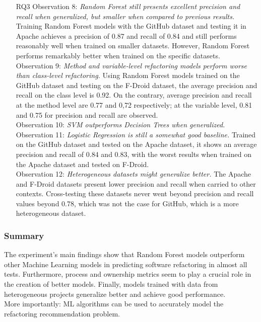 \begin{itemize}
    \item[RQ3] Observation 8: \textit{Random Forest still presents excellent precision and recall when generalized, but smaller when compared to previous results.} Training Random Forest models with the GitHub dataset and testing it in Apache achieves a precision of 0.87 and recall of 0.84 and still performs reasonably well when trained on smaller datasets. However, Random Forest performs remarkably better when trained on the specific datasets.\\Observation 9: \textit{Method and variable-level refactoring models perform worse than class-level refactoring.} Using Random Forest models trained on the GitHub dataset and testing on the F-Droid dataset, the average precision and recall on the class level is 0.92. On the contrary, average precision and recall at the method level are 0.77 and 0,72 respectively; at the variable level, 0.81 and 0.75 for precision and recall are observed.\\ Observation 10: \textit{SVM outperforms Decision Trees when generalized.} \\ Observation 11: \textit{Logistic Regression is still a somewhat good baseline.} Trained on the GitHub dataset and tested on the Apache dataset, it shows an average precision and recall of 0.84 and 0.83, with the worst results when trained on the Apache dataset and tested on F-Droid. \\ Observation 12: \textit{Heterogeneous datasets might generalize better.} The Apache and F-Droid datasets present lower precision and recall when carried to other contexts. Cross-testing these datasets never went beyond precision and recall values beyond 0.78, which was not the case for GitHub, which is a more heterogeneous dataset.
\end{itemize}
\subsubsection{Summary}
The experiment's main findings show that Random Forest models outperform other Machine Learning models in predicting software refactoring in almost all tests. Furthermore, process and ownership metrics seem to play a crucial role in the creation of better models. Finally, models trained with data from heterogeneous projects generalize better and achieve good performance.\\
More importantly: ML algorithms can be used to accurately model the refactoring recommendation problem.
